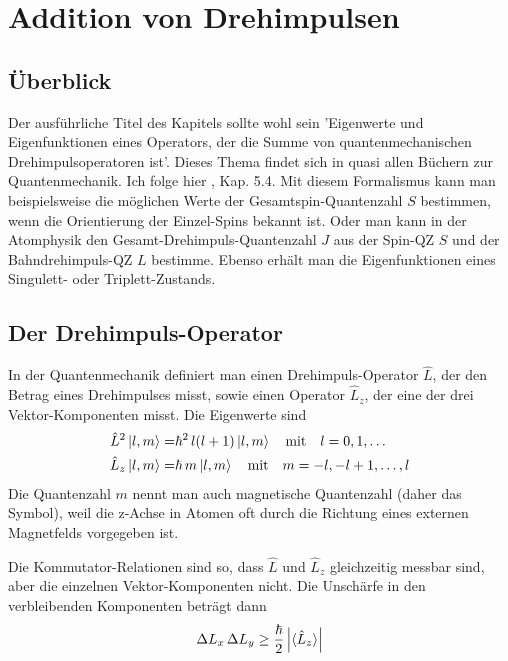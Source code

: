 \renewcommand{\chapterauthors}{Markus Lippitz}
\renewcommand{\lastmod}{5. Oktober 2021}

\chapter{Addition von Drehimpulsen}

\label{chap:anhang_drehimpuls}

\section{Überblick}

Der ausführliche Titel des Kapitels sollte wohl sein 'Eigenwerte und Eigenfunktionen eines Operators, der die Summe von quantenmechanischen Drehimpulsoperatoren ist'. Dieses Thema findet sich in quasi allen Büchern zur Quantenmechanik. Ich folge hier \cite{Nolting-QM}, Kap. 5.4. Mit diesem Formalismus kann man beispielsweise die möglichen Werte der Gesamtspin-Quantenzahl $S$ bestimmen, wenn die Orientierung der Einzel-Spins bekannt ist. Oder man kann in der Atomphysik den Gesamt-Drehimpuls-Quantenzahl $J$ aus der Spin-QZ $S$ und der Bahndrehimpuls-QZ $L$ bestimme. Ebenso erhält man die Eigenfunktionen eines Singulett- oder Triplett-Zustands.

\section{Der Drehimpuls-Operator}

In der Quantenmechanik definiert man einen Drehimpuls-Operator $\hat{L}$, der den Betrag eines Drehimpulses misst, sowie einen Operator $\hat{L}_z$, der eine der drei Vektor-Komponenten misst. Die Eigenwerte sind 
\begin{align}
	\hat{L}^2 \ket{l, m}  = & \hbar^2 \, l (l +1 ) \ket{l, m} \quad 
	\text{mit} \quad l = 0, 1, \dots \\
	\hat{L}_z \ket{l, m} = & \hbar \, m \ket{l, m} \quad 
	\text{mit} \quad m = -l, -l +1, \dots , l
\end{align}
Die Quantenzahl $m$ nennt man auch magnetische Quantenzahl (daher das Symbol), weil die z-Achse in Atomen oft durch die Richtung eines externen Magnetfelds vorgegeben ist.

Die Kommutator-Relationen sind so, dass $\hat{L}$ und $\hat{L}_z$ gleichzeitig messbar sind, aber die  einzelnen Vektor-Komponenten nicht. Die Unschärfe in den verbleibenden Komponenten beträgt dann
\begin{equation}
\Delta L_x \, \Delta L_y \ge \frac{\hbar}{2} \left| \braket{\hat{L}_z} \right|
\end{equation}

